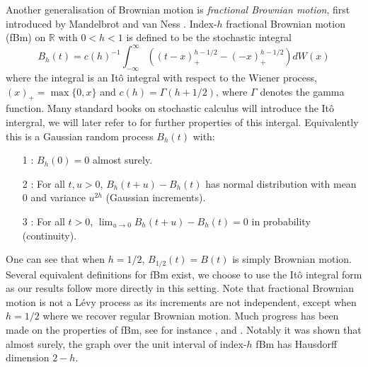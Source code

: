 Another generalisation of Brownian motion is \emph{fractional Brownian motion}, first introduced by Mandelbrot and van Ness \cite{MVN}. Index-$h$ fractional Brownian motion (fBm) on $\mathbb{R}$ with $0<h<1$ is defined to be the stochastic integral 
\[
B_h (t) = c(h)^{-1} \int_{-\infty}^\infty \left(\left( t-x \right)_+^{h-1/2} - (-x)_+^{h-1/2} \right)dW(x)
\]
where the integral is an It\^{o} integral with respect to the Wiener process, $(x)_+ = \max\{0,x\}$ and $c(h) = \Gamma(h+1/2)$, where $\Gamma$ denotes the gamma function. Many standard books on stochastic calculus will introduce the It\^{o} intergral, we will later refer to \cite{protter} for further properties of this intergal. Equivalently this is a Gaussian random process $B_h(t)$ with:
\begin{itemize}
	\item[1]: $B_h(0)=0$ almost surely.
	\item[2]: For all $t,u>0$, $B_h(t+u)-B_h(t)$ has normal distribution with mean 0 and variance $u^{2h}$ (Gaussian increments).
	\item[3]: For all $t>0$, $\lim_{u\to 0} B_h(t+u)-B_h(t)=0$ in probability (continuity).
\end{itemize}
One can see that when $h=1/2$, $B_{1/2}(t) = B(t)$ is simply Brownian motion. Several equivalent definitions for fBm exist, we choose to use the It\^{o} integral form as our results follow more directly in this setting. Note that fractional Brownian motion is not a L\'evy process as its increments are not independent, except when $h = 1/2$ where we recover regular Brownian motion. Much progress has been made on the properties of fBm, see for instance \cite{Ad},\cite{Ka} and \cite{Fa2}. Notably it was shown that almost surely, the graph over the unit interval of index-$h$ fBm has Hausdorff dimension $2-h$. 

